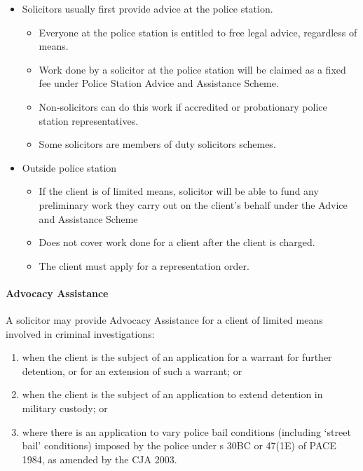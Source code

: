\documentclass[
]{article}
\providecommand{\tightlist}{%
  \setlength{\itemsep}{0pt}\setlength{\parskip}{0pt}}
\begin{document}
\begin{itemize}
\tightlist
\item
  Solicitors usually first provide advice at the police station.

  \begin{itemize}
  \tightlist
  \item
    Everyone at the police station is entitled to free legal advice,
    regardless of means.
  \item
    Work done by a solicitor at the police station will be claimed as a
    fixed fee under Police Station Advice and Assistance Scheme.
  \item
    Non-solicitors can do this work if accredited or probationary police
    station representatives.
  \item
    Some solicitors are members of duty solicitors schemes.
  \end{itemize}
\item
  Outside police station

  \begin{itemize}
  \tightlist
  \item
    If the client is of limited means, solicitor will be able to fund
    any preliminary work they carry out on the client's behalf under the
    Advice and Assistance Scheme
  \item
    Does not cover work done for a client after the client is charged.
  \item
    The client must apply for a representation order.
  \end{itemize}
\end{itemize}

\hypertarget{advocacy-assistance}{%
\paragraph{Advocacy Assistance}\label{advocacy-assistance}}

A solicitor may provide Advocacy Assistance for a client of limited
means involved in criminal investigations:

\begin{enumerate}
\def\labelenumi{\arabic{enumi}.}
\tightlist
\item
  when the client is the subject of an application for a warrant for
  further detention, or for an extension of such a warrant; or
\item
  when the client is the subject of an application to extend detention
  in military custody; or
\item
  where there is an application to vary police bail conditions
  (including `street bail' conditions) imposed by the police under s
  30BC or 47(1E) of PACE 1984, as amended by the CJA 2003.
\end{enumerate}
\end{document}
